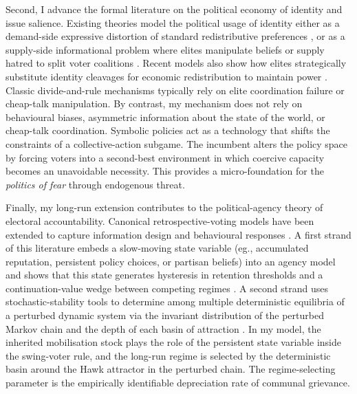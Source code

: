 \documentclass[11pt,twoside]{extarticle}
\begin{document}

Second, I advance the formal literature on the political economy of identity and issue salience. 
Existing theories model the political usage of identity either as a demand-side expressive distortion of standard redistributive preferences \citep{shayoModelSocialIdentity2009, besleyRiseIdentityPolitics2019, gennaioliIdentityPolitics2023}, or as a supply-side informational problem where elites manipulate beliefs or supply hatred to split voter coalitions \citep*{glaeserPoliticalEconomyHatred2005, baligaStrategyManipulatingConflict2012, izzoIdeologicalCompetition2023, callanderCauseEffectPolitical2022}. 
Recent models also show how elites strategically substitute identity cleavages for economic redistribution to maintain power \citep*{acemogluKleptocracyDivideandRuleModel2004,padróimiquelControlPoliticiansDivided2007,mukandPoliticalEconomyLiberal2020}. 
Classic divide-and-rule mechanisms typically rely on elite coordination failure or cheap-talk manipulation. 
By contrast, my mechanism does not rely on behavioural biases, asymmetric information about the state of the world, or cheap-talk coordination. 
Symbolic policies act as a technology that shifts the constraints of a collective-action subgame. 
The incumbent alters the policy space by forcing voters into a second-best environment in which coercive capacity becomes an unavoidable necessity. 
This provides a micro-foundation for the \emph{politics of fear} through endogenous threat.


Finally, my long-run extension contributes to the political-agency theory of electoral accountability.
Canonical retrospective-voting models \citep*{barroControlPoliticiansEconomic1973,ferejohnIncumbentPerformanceElectoral1986} have been extended to capture information design \citep*{banksRepeatedElectionsModel1993,przeworskiDemocracyAccountabilityRepresentation1999,sandroniWhenConfrontRole2018a,acharyaPoliticalAccountabilityMoral2025} and behavioural responses \citep*{levyCorrelationNeglectVoting2015,ortolevaOverconfidencePoliticalBehavior2015,liElectoralAccountabilitySelection2023,vaethVoterLearningUnidimensional2023}. 
A first strand of this literature embeds a slow-moving state variable (eg., accumulated reputation, persistent policy choices, or partisan beliefs) into an agency model and shows that this state generates hysteresis in retention thresholds and a continuation-value wedge between competing regimes \citep*{coatePolicyPersistence1999,padróimiquelControlPoliticiansDivided2007}. 
A second strand uses stochastic-stability tools to determine among multiple deterministic equilibria of a perturbed dynamic system via the invariant distribution of the perturbed Markov chain and the depth of each basin of attraction \citep*{kandoriLearningMutationLong1993a,meynMarkovChainsStochastic2012}. 
In my model, the inherited mobilisation stock plays the role of the persistent state variable inside the swing-voter rule, and the long-run regime is selected by the deterministic basin around the Hawk attractor in the perturbed chain. The regime-selecting parameter is the empirically identifiable depreciation rate of communal grievance.
\end{document}
